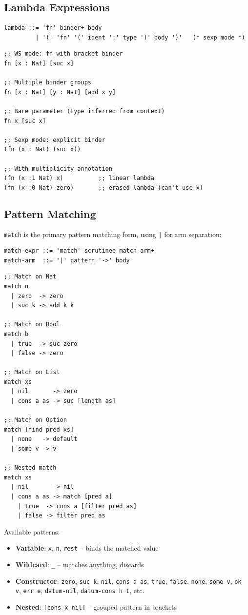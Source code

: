 \documentclass[11pt]{article}
\begin{document}
\subsection{Lambda Expressions}
\label{sec:org5317ab4}

\begin{verbatim}
lambda ::= 'fn' binder+ body
         | '(' 'fn' '(' ident ':' type ')' body ')'   (* sexp mode *)
\end{verbatim}

\begin{verbatim}
;; WS mode: fn with bracket binder
fn [x : Nat] [suc x]

;; Multiple binder groups
fn [x : Nat] [y : Nat] [add x y]

;; Bare parameter (type inferred from context)
fn x [suc x]

;; Sexp mode: explicit binder
(fn (x : Nat) (suc x))

;; With multiplicity annotation
(fn (x :1 Nat) x)          ;; linear lambda
(fn (x :0 Nat) zero)       ;; erased lambda (can't use x)
\end{verbatim}
\subsection{Pattern Matching}
\label{sec:orgb870e5f}

\texttt{match} is the primary pattern matching form, using \texttt{|} for arm separation:

\begin{verbatim}
match-expr ::= 'match' scrutinee match-arm+
match-arm  ::= '|' pattern '->' body
\end{verbatim}

\begin{verbatim}
;; Match on Nat
match n
  | zero  -> zero
  | suc k -> add k k

;; Match on Bool
match b
  | true  -> suc zero
  | false -> zero

;; Match on List
match xs
  | nil       -> zero
  | cons a as -> suc [length as]

;; Match on Option
match [find pred xs]
  | none   -> default
  | some v -> v

;; Nested match
match xs
  | nil       -> nil
  | cons a as -> match [pred a]
    | true  -> cons a [filter pred as]
    | false -> filter pred as
\end{verbatim}

Available patterns:
\begin{itemize}
\item \textbf{Variable}: \texttt{x}, \texttt{n}, \texttt{rest} -- binds the matched value
\item \textbf{Wildcard}: \texttt{\_} -- matches anything, discards
\item \textbf{Constructor}: \texttt{zero}, \texttt{suc k}, \texttt{nil}, \texttt{cons a as}, \texttt{true}, \texttt{false},
\texttt{none}, \texttt{some v}, \texttt{ok v}, \texttt{err e}, \texttt{datum-nil}, \texttt{datum-cons h t}, etc.
\item \textbf{Nested}: \texttt{[cons x nil]} -- grouped pattern in brackets
\end{itemize}
\end{document}
